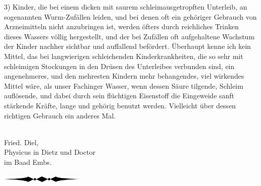 \documentclass[fontsize=11pt,a5paper,twoside]{memoir}
\begin{document}
3) Kinder, die bei einem dicken mit saurem schleimausgetropften Unterleib,
an sogenannten Wurm-Zufällen leiden,
und bei denen oft ein gehöriger Gebrauch
von  Arzneimitteln nicht anzubringen ist,
werden öfters durch reichliches Trinken dieses Wassers völlig hergestellt,
und der bei Zufällen oft aufgehaltene Wachstum der Kinder
nachher sichtbar und auffallend befördert.
Überhaupt kenne ich kein Mittel,
das bei langwierigen schleichenden Kinderkrankheiten,
die so sehr mit schleimigen Stockungen
in den Drüsen des Unterleibes verbunden sind,
ein angenehmeres, und den mehresten Kindern mehr behangendes,
viel wirkendes Mittel wäre,
als unser Fachinger Wasser,
wenn dessen Säure tilgende, Schleim auflösende,
und dabei durch sein flüchtigen Eisenstoff
die Eingeweide sanft stärkende Kräfte,
lange und gehörig benutzt werden.
Vielleicht über dessen richtigen Gebrauch ein anderes Mal.\\
\\

\hfill
\begin{minipage}{6cm}
  \centering
{\Large Fried. Diel,}\\
Physicus in Dietz und Doctor\\
im Baad Embs.
\end{minipage}

\vfill
\begin{center}
\includegraphics[width=4cm]{figures/div2}
\end{center}
\vfill%
%
\checkoddpage\ifoddpage
  \newpage\strut
  \fancyhead[C]{}\fi
\end{document}
